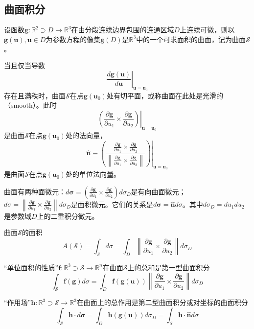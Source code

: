 \documentclass[main.tex]{subfiles}
\begin{document}
\subsection{曲面积分}
设函数$\mathbf{g}:\mathbb{R}^2\supset D\rightarrow\mathbb{R}^3$在由分段连续边界包围的连通区域$D$上连续可微，则以$\mathbf{g}\left(\mathbf{u}\right),\mathbf{u}\in D$为参数方程的像集$\mathbf{g}\left(D\right)$是$\mathbb{R}^3$中的一个可求面积的曲面，记为曲面$\mathcal{S}$。

当且仅当导数
\[
\left.\frac{d\mathbf{g}\left(\mathbf{u}\right)}{d\mathbf{u}}\right|_{\mathbf{u}=\mathbf{u}_0}
\]
存在且满秩时，曲面$\mathcal{S}$在点$\mathbf{g}\left(\mathbf{u}_0\right)$处有切平面，或称曲面在此处是光滑的（smooth）。此时
\[
\left.\left(\frac{\partial \mathbf{g}}{\partial u_1}\times\frac{\partial \mathbf{g}}{\partial u_2}\right)\right|_{\mathbf{u}=\mathbf{u}_0}
\]
是曲面$\mathcal{S}$在点$\mathbf{g}\left(\mathbf{u}_0\right)$处的法向量，
\[
\mathbf{\hat{n}}\equiv\left.\left(\frac{\frac{\partial \mathbf{g}}{\partial u_1}\times\frac{\partial\mathbf{g}}{\partial u_2}}{\left\|\frac{\partial\mathbf{g}}{\partial u_1}\times\frac{\partial\mathbf{g}}{\partial u_2}\right\|}\right)\right|_{\mathbf{u}=\mathbf{u}_0}
\]
是曲面$\mathcal{S}$在点$\mathbf{g}\left(\mathbf{u}_0\right)$处的单位法向量。

曲面有两种面微元：$d\boldsymbol{\sigma}=\left(\frac{\partial\mathbf{g}}{\partial u_1}\times\frac{\partial\mathbf{g}}{\partial u_2}\right)d\sigma_D$是有向曲面微元；$d\sigma=\left\|\frac{\partial\mathbf{g}}{\partial u_1}\times\frac{\partial\mathbf{g}}{\partial u_2}\right\|d\sigma_D$是面积微元。它们的关系是$d\boldsymbol{\sigma}=\mathbf{\hat{n}}d\sigma$。其中$d\sigma_D=du_1du_2$是参数域$D$上的二重积分微元。

曲面$\mathcal{S}$的面积
\[
A\left(\mathcal{S}\right)=\int_\mathcal{S}d\sigma=\int_D\left\|\frac{\partial\mathbf{g}}{\partial u_1}\times\frac{\partial\mathbf{g}}{\partial u_2}\right\|d\sigma_D
\]

“单位面积的性质”$\mathbf{f}:\mathbb{R}^3\supset \mathcal{S}\rightarrow\mathbb{R}^n$在曲面$\mathcal{S}$上的总和是第一型曲面积分\cite[p.~165,定理9.4.1]{华工高数2009下}
\[
\int_\mathcal{S}\mathbf{f}\left(\mathbf{g}\right)d\sigma=\int_D\mathbf{f}\left(\mathbf{g}\left(\mathbf{u}\right)\right)\left\|\frac{\partial\mathbf{g}}{\partial u_1}\times\frac{\partial\mathbf{g}}{\partial u_2}\right\|d\sigma_D
\]

“作用场”$\mathbf{h}:\mathbb{R}^3\supset\mathcal{S}\rightarrow\mathbb{R}^3$在曲面上的总作用是第二型曲面积分或对坐标的曲面积分\cite[p.~170,第五节]{华工高数2009下}
\[
\int_\mathcal{S}\mathbf{h}\cdot d\boldsymbol{\sigma}=\int_D\mathbf{h}\left(\mathbf{g}\left(\mathbf{u}\right)\right)d\sigma_D=\int_\mathcal{S}\mathbf{h}\cdot\mathbf{\hat{n}}d\sigma
\]
\end{document}
